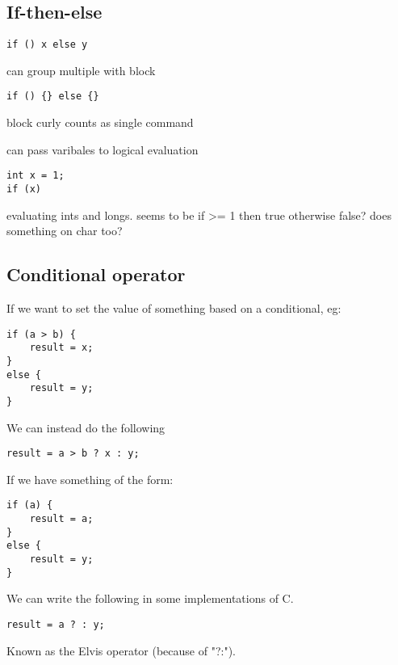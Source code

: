 
\subsection{If-then-else}

\begin{verbatim}
if () x else y
\end{verbatim}
can group multiple with block

\begin{verbatim}
if () {} else {}
\end{verbatim}
block curly counts as single command



can pass varibales to logical evaluation
\begin{verbatim}
int x = 1;
if (x)
\end{verbatim}

evaluating ints and longs. seems to be if >= 1 then true otherwise false?
does something on char too?

\subsection{Conditional operator}

If we want to set the value of something based on a conditional, eg:

\begin{verbatim}
if (a > b) {
    result = x;
}
else {
    result = y;
}
\end{verbatim}

We can instead do the following

\begin{verbatim}
result = a > b ? x : y;
\end{verbatim}

If we have something of the form:

\begin{verbatim}
if (a) {
    result = a;
}
else {
    result = y;
}
\end{verbatim}


We can write the following in some implementations of C.

\begin{verbatim}
result = a ? : y;
\end{verbatim}

Known as the Elvis operator (because of "?:").



